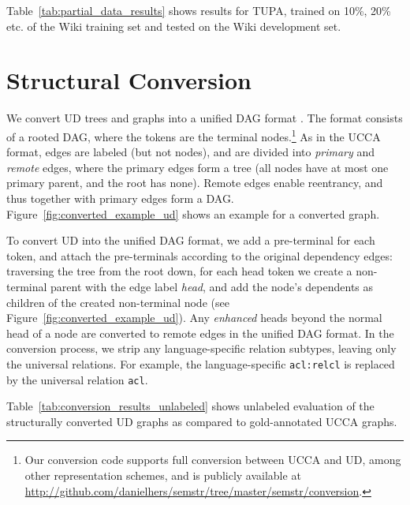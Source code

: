 \documentclass[11pt,a4paper]{article}
\begin{document}
Table~\ref{tab:partial_data_results} shows results for TUPA,
trained on 10\%, 20\% etc. of the Wiki training set and tested on the Wiki development set.


\section{Structural Conversion}\label{sec:conversion}

We convert UD trees and graphs into a unified DAG format \cite{hershcovich2018multitask,hershcovich2018universal}.
The format consists of a rooted DAG, where the tokens are the terminal
nodes.\footnote{Our conversion code supports full conversion between UCCA and UD,
among other representation schemes,
and is publicly available at \url{http://github.com/danielhers/semstr/tree/master/semstr/conversion}.}
As in the UCCA format, edges are labeled (but not nodes),
and are divided into \textit{primary} and \textit{remote} edges,
where the primary edges form a tree (all nodes have at most one primary parent,
and the root has none).
Remote edges enable reentrancy, and thus together with primary edges
form a DAG.
Figure~\ref{fig:converted_example_ud} shows an example for a converted graph.

To convert UD into the unified DAG format,
we add a pre-terminal for each token,
and attach the pre-terminals according to the original dependency edges:
traversing the tree from the root down, for each head token we create a non-terminal
parent with the edge label {\it head},
and add the node's dependents as children of the created non-terminal node
(see Figure~\ref{fig:converted_example_ud}).
Any \textit{enhanced}
heads beyond the normal head of a node are converted to remote edges in the unified DAG format.
In the conversion process, we strip any language-specific relation subtypes,
leaving only the universal relations.
For example, the language-specific \verb|acl:relcl| is replaced by the universal relation \verb|acl|.

Table~\ref{tab:conversion_results_unlabeled} shows unlabeled evaluation of the
structurally converted UD graphs as compared to gold-annotated UCCA graphs.
\end{document}
